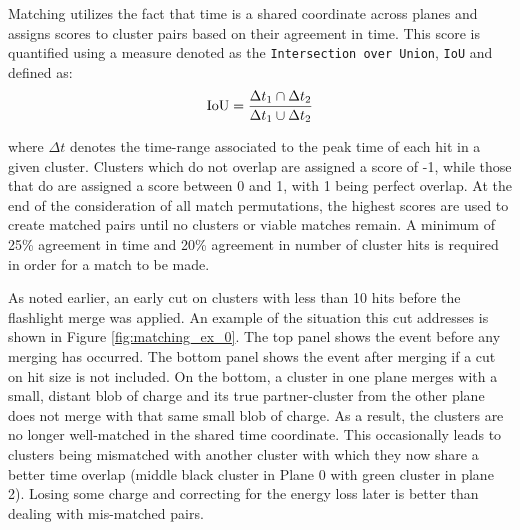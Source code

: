 \par Matching utilizes the fact that time is a shared coordinate across planes and assigns scores to cluster pairs based on their agreement in time. This score is quantified using a measure denoted as the \texttt{Intersection over Union}, \texttt{IoU} and defined as:
\begin{equation}
  {\rm IoU} = \frac{ \Delta t_1 \cap \Delta t_2  }{ \Delta t_1 \cup \Delta t_2 }
\end{equation}

\noindent where $\Delta t$ denotes the time-range associated to the peak time of each hit in a given cluster.  Clusters which do not overlap are assigned a score of -1, while those that do are assigned a score between 0 and 1, with 1 being perfect overlap. At the end of the consideration of all match permutations, the highest scores are used to create matched pairs until no clusters or viable matches remain. A minimum of 25\% agreement in time and 20\% agreement in number of cluster hits is required in order for a match to be made. 
\par As noted earlier, an early cut on clusters with less than 10 hits before the flashlight merge was applied. An example of the situation this cut addresses is shown in Figure \ref{fig:matching_ex_0}. The top panel shows the event before any merging has occurred. The bottom panel shows the event after merging if a cut on hit size is not included. On the bottom, a cluster in one plane merges with a small, distant blob of charge and its true partner-cluster from the other plane does not merge with that same small blob of charge. As a result, the clusters are no longer well-matched in the shared time coordinate.  This occasionally leads to clusters being mismatched with another cluster with which they now share a better time overlap (middle black cluster in Plane 0 with green cluster in plane 2). Losing some charge and correcting for the energy loss later is better than dealing with mis-matched pairs.


